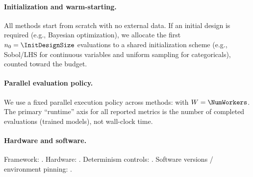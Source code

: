 \paragraph{Initialization and warm-starting.}
All methods start from scratch with no external data.
If an initial design is required (e.g., Bayesian optimization), we allocate the first \(n_0=\InitDesignSize\) evaluations to a shared
initialization scheme (e.g., Sobol/LHS for continuous variables and uniform sampling for categoricals), counted toward the budget.

\paragraph{Parallel evaluation policy.}
We use a fixed parallel execution policy across methods: \ParallelismPolicy{} with \(W=\NumWorkers\).
The primary ``runtime'' axis for all reported metrics is the number of completed evaluations (trained models), not wall-clock time.

\paragraph{Hardware and software.}
Framework: \Framework{}.
Hardware: \Hardware{}.
Determinism controls: \DeterminismConstraints{}.
Software versions / environment pinning: \SoftwareVersions{}.
